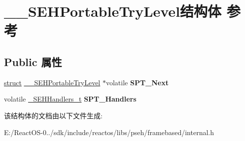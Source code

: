 \hypertarget{struct_____s_e_h_portable_try_level}{}\section{\+\_\+\+\_\+\+S\+E\+H\+Portable\+Try\+Level结构体 参考}
\label{struct_____s_e_h_portable_try_level}
\subsection*{Public 属性}
\begin{DoxyCompactItemize}
\item 
\mbox{\label{struct_____s_e_h_portable_try_level_a3999c5316f8f3e2e944f8f0f4f5d3876}} 
\hyperlink{interfacestruct}{struct} \hyperlink{struct_____s_e_h_portable_try_level}{\+\_\+\+\_\+\+S\+E\+H\+Portable\+Try\+Level} $\ast$volatile {\bfseries S\+P\+T\+\_\+\+Next}
\item 
\mbox{\label{struct_____s_e_h_portable_try_level_aee236da40ae157d128295a482e97da39}} 
volatile \hyperlink{struct_____s_e_h_handlers}{\+\_\+\+S\+E\+H\+Handlers\+\_\+t} {\bfseries S\+P\+T\+\_\+\+Handlers}
\end{DoxyCompactItemize}


该结构体的文档由以下文件生成\+:\begin{DoxyCompactItemize}
\item 
E\+:/\+React\+O\+S-\/0../sdk/include/reactos/libs/pseh/framebased/internal.\+h\end{DoxyCompactItemize}
